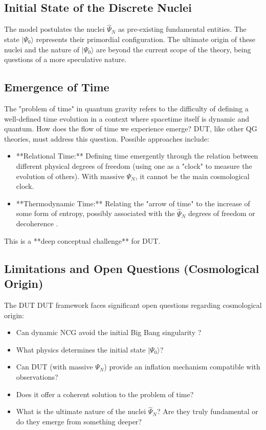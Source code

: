 \documentclass[11pt, a4paper]{article}
\theoremstyle{remark}
\newcommand{\Op}[1]{\hat{#1}}
\begin{document}
\subsection{Initial State of the Discrete Nuclei}
\label{subsec:initial_state_nuclei_final}
The model postulates the nuclei \( \hat{\Psi}_N \) as pre-existing fundamental entities. The state \( |\Psi_0\rangle \) represents their primordial configuration. The ultimate origin of these nuclei and the nature of \( |\Psi_0\rangle \) are beyond the current scope of the theory, being questions of a more speculative nature.

\subsection{Emergence of Time}
\label{subsec:time_emergence_final}
The "problem of time" in quantum gravity \citep{ProblemOfTimeRef} refers to the difficulty of defining a well-defined time evolution in a context where spacetime itself is dynamic and quantum. How does the flow of time we experience emerge? DUT, like other QG theories, must address this question. Possible approaches include:
\begin{itemize}
    \item **Relational Time:** Defining time emergently through the relation between different physical degrees of freedom (using one as a "clock" to measure the evolution of others). With massive \( \Psi_N \), it cannot be the main cosmological clock.
    \item **Thermodynamic Time:** Relating the "arrow of time" to the increase of some form of entropy, possibly associated with the \( \Op{\Psi}_N \) degrees of freedom or decoherence \citep{KieferQuantumGravityBook, Kiefer:2008sw}.
\end{itemize}
This is a **deep conceptual challenge** for DUT.

\subsection{Limitations and Open Questions (Cosmological Origin)}
\label{subsec:origin_limitations_final_revised}
The DUT DUT framework faces significant open questions regarding cosmological origin:
\begin{itemize}
    \item Can dynamic NCG avoid the initial Big Bang singularity \citep[cf.][]{Nicolini:2008aj}?
    \item What physics determines the initial state \( |\Psi_0\rangle \)?
    \item Can DUT (with massive \( \Psi_N \)) provide an inflation mechanism compatible with observations?
    \item Does it offer a coherent solution to the problem of time?
    \item What is the ultimate nature of the nuclei \( \hat{\Psi}_N \)? Are they truly fundamental or do they emerge from something deeper?
\end{itemize}
\end{document}
